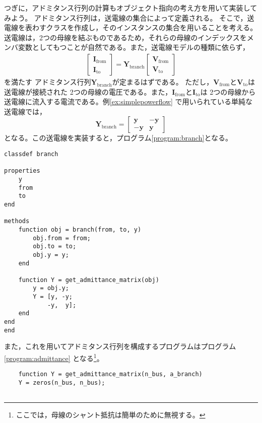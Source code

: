 {\begin{例}[より良い実装]
つぎに，アドミタンス行列の計算もオブジェクト指向の考え方を用いて実装してみよう。
アドミタンス行列は，送電線の集合によって定義される。
そこで，送電線を表わすクラスを作成し，そのインスタンスの集合を用いることを考える。
送電線は，2つの母線を結ぶものであるため，それらの母線のインデックスをメンバ変数としてもつことが自然である。また，送電線モデルの種類に依らず，
\begin{align}
\begin{bmatrix}
\bm I_\mathrm{from}\\\bm I_\mathrm{to}\end{bmatrix} =
\bm Y_\mathrm{branch}
\begin{bmatrix}
\bm V_\mathrm{from}\\\bm V_\mathrm{to}\end{bmatrix}
\end{align}
を満たす
アドミタンス行列$\bm Y_\mathrm{branch}$が定まるはずである。
ただし，$\bm V_\mathrm{from}$と$\bm V_\mathrm{to}$は送電線が接続された
2つの母線の電圧である。また，$\bm I_\mathrm{from}$と$\bm I_\mathrm{to}$は
2つの母線から送電線に流入する電流である。例\ref{ex:simplepowerflow}
で用いられている単純な送電線では，
\[
\bm Y_\mathrm{branch} = \begin{bmatrix}
\bm y & -\bm y\\
-\bm y & \bm y
\end{bmatrix}
\]
となる。この送電線を実装すると，プログラム\ref{program:branch}となる。
\begin{PROGRAMA}[count,title={branch.m}]\label{program:branch}
\begin{verbatim}
classdef branch

properties
    y
    from
    to
end

methods
    function obj = branch(from, to, y)
        obj.from = from;
        obj.to = to;
        obj.y = y;
    end
    
    function Y = get_admittance_matrix(obj)
        y = obj.y;
        Y = [y, -y;
            -y,  y];
    end
end
end
\end{verbatim}\end{PROGRAMA}
また，これを用いてアドミタンス行列を構成するプログラムはプログラム\ref{program:admittance}
となる\footnote{ここでは，母線のシャント抵抗は簡単のために無視する。}。
\begin{PROGRAMA}[count,title={get\_admittance\_matrix.m}]\label{program:admittance}
\begin{verbatim}
    function Y = get_admittance_matrix(n_bus, a_branch)
    Y = zeros(n_bus, n_bus);
    

\end{verbatim}
\end{PROGRAMA}
\end{例}}
